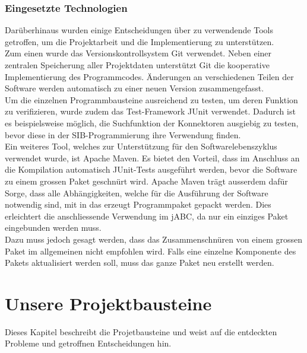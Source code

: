 \subsubsection{Eingesetzte Technologien}
Darüberhinaus wurden einige Entscheidungen über zu verwendende Tools getroffen, um die Projektarbeit und die Implementierung zu unterstützen.\\

Zum einen wurde das Versionskontrollsystem Git verwendet. Neben einer zentralen Speicherung aller Projektdaten unterstützt Git die kooperative Implementierung des Programmcodes. Änderungen an verschiedenen Teilen der Software werden automatisch zu einer neuen Version zusammengefasst.\\

Um die einzelnen Programmbausteine ausreichend zu testen, um deren Funktion zu verifizieren, wurde zudem das Test-Framework JUnit verwendet. Dadurch ist es beispielsweise möglich, die Suchfunktion der Konnektoren ausgiebig zu testen, bevor diese in der SIB-Programmierung ihre Verwendung finden.\\

Ein weiteres Tool, welches zur Unterstützung für den Softwarelebenszyklus verwendet wurde, ist Apache Maven. Es bietet den Vorteil, dass im Anschluss an die Kompilation automatisch JUnit-Tests ausgeführt werden, bevor die Software zu einem grossen Paket geschnürt wird. Apache Maven trägt ausserdem dafür Sorge, dass alle Abhängigkeiten, welche für die Ausführung der Software notwendig sind, mit in das erzeugt Programmpaket gepackt werden. Dies erleichtert die anschliessende Verwendung im jABC, da nur ein einziges Paket eingebunden werden muss.\\

Dazu muss jedoch gesagt werden, dass das Zusammenschnüren von einem grossen Paket im allgemeinen nicht empfohlen wird. Falls eine einzelne Komponente des Pakets aktualisiert werden soll, muss das ganze Paket neu erstellt werden. 

\section{Unsere Projektbausteine}
\label{sec:projektbausteine}
Dieses Kapitel beschreibt die Projetbausteine und weist auf die entdeckten Probleme und getroffnen Entscheidungen hin.
